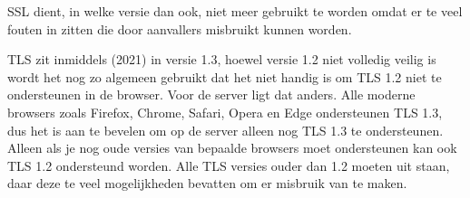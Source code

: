 SSL dient, in welke versie dan ook, niet meer gebruikt te worden omdat er te veel fouten in zitten die door aanvallers misbruikt kunnen worden.

TLS zit inmiddels (2021) in versie 1.3, hoewel versie 1.2 niet volledig veilig is wordt het nog zo algemeen gebruikt dat het niet handig is om TLS 1.2 niet te ondersteunen in de browser. Voor de server ligt dat anders. Alle moderne browsers zoals Firefox, Chrome, Safari, Opera en Edge ondersteunen TLS 1.3, dus het is aan te bevelen om op de server alleen nog TLS 1.3 te ondersteunen. Alleen als je nog oude versies van bepaalde browsers moet ondersteunen kan ook TLS 1.2 ondersteund worden. Alle TLS versies ouder dan 1.2 moeten uit staan, daar deze te veel mogelijkheden bevatten om er misbruik van te maken.
